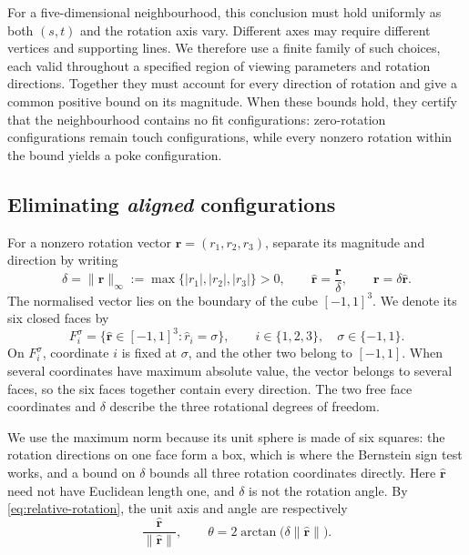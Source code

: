 For a five-dimensional neighbourhood, this conclusion must hold uniformly
as both $(s,t)$ and the rotation axis vary. Different axes may require
different vertices and supporting lines. We therefore use a finite family
of such choices, each valid throughout a specified region of viewing
parameters and rotation directions. Together they must account for every
direction of rotation and give a common positive bound on its magnitude.
When these bounds hold, they certify that the neighbourhood contains no
fit configurations:
zero-rotation configurations remain touch configurations, while every
nonzero rotation within the bound yields a poke configuration.


\subsection{Eliminating \emph{aligned} configurations}\label{subsec:eliminating-aligned-configurations}

For a nonzero rotation vector $\mathbf r=(r_1,r_2,r_3)$, separate its magnitude
and direction by writing
\begin{equation}\label{eq:normalised-rotation-direction}
  \delta=\lVert\mathbf r\rVert_\infty
         :=\max\{|r_1|,|r_2|,|r_3|\}>0,
  \qquad \widehat{\mathbf r}=\frac{\mathbf r}{\delta},
  \qquad \mathbf r=\delta\widehat{\mathbf r}.
\end{equation}
The normalised vector lies on the boundary of the cube ${[-1,1]}^3$.
We denote its six closed faces by
\[
  F_i^\sigma=\{\widehat{\mathbf r}\in{[-1,1]}^3:
                     \widehat r_i=\sigma\},
  \qquad i\in\{1,2,3\},\quad\sigma\in\{-1,1\}.
\]
On $F_i^\sigma$, coordinate $i$ is fixed at $\sigma$, and the other
two belong to $[-1,1]$.
When several coordinates have maximum absolute value, the vector belongs
to several faces, so the six faces together contain every direction.
The two free face coordinates and $\delta$ describe the three rotational
degrees of freedom.

We use the maximum norm because its unit sphere is made of six squares:
the rotation directions on one face form a box, which is where the
Bernstein sign test works, and a bound on $\delta$ bounds all three
rotation coordinates directly. Here $\widehat{\mathbf r}$ need not have
Euclidean length one, and $\delta$ is not the rotation angle. By
\cref{eq:relative-rotation}, the unit axis and angle are respectively
\[
  \frac{\widehat{\mathbf r}}{\lVert\widehat{\mathbf r}\rVert},
  \qquad
  \theta=2\arctan\bigl(\delta\lVert\widehat{\mathbf r}\rVert\bigr).
\]

